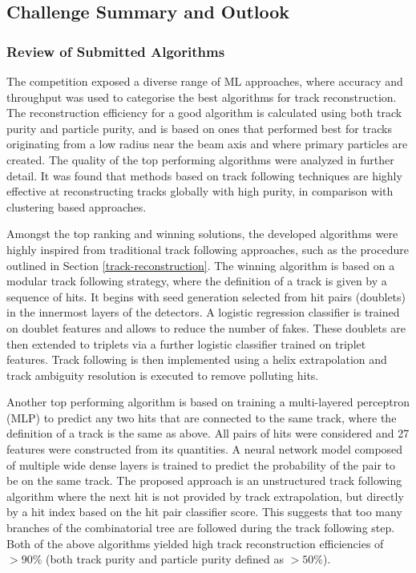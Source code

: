 
\subsection{Challenge Summary and Outlook}
\label{trackml-key-findings}

\subsubsection{Review of Submitted Algorithms}
The competition exposed a diverse range of ML approaches, where accuracy and throughput was used to categorise the best algorithms for track reconstruction. The reconstruction efficiency for a good algorithm is calculated using both track purity and particle purity, and is based on ones that performed best for tracks originating from a low radius near the beam axis and where primary particles are created. The quality of the top performing algorithms were analyzed in further detail. It was found that methods based on track following techniques are highly effective at reconstructing tracks globally with high purity, in comparison with clustering based approaches. 

Amongst the top ranking and winning solutions, the developed algorithms were highly inspired from traditional track following approaches, such as the procedure outlined in Section \ref{track-reconstruction}. The winning algorithm is based on a modular track following strategy, where the definition of a track is given by a sequence of hits. It begins with seed generation selected from hit pairs (doublets) in the innermost layers of the detectors. A logistic regression classifier is trained on doublet features and allows to reduce the number of fakes. These doublets are then extended to triplets via a further logistic classifier trained on triplet features. Track following is then implemented using a helix extrapolation and track ambiguity resolution is executed to remove polluting hits.


Another top performing algorithm is based on training a multi-layered perceptron (MLP) to predict any two hits that are connected to the same track, where the definition of a track is the same as above. All pairs of hits were considered and 27 features were constructed from its quantities. A neural network model composed of multiple wide dense layers is trained to predict the probability of the pair to be on the same track. The proposed approach is an unstructured track following algorithm where the next hit is not provided by track extrapolation, but directly by a hit index based on the hit pair classifier score. This suggests that too many branches of the combinatorial tree are followed during the track following step. Both of the above algorithms yielded high track reconstruction efficiencies of $> 90\%$ (both track purity and particle purity defined as $> 50\%$).

